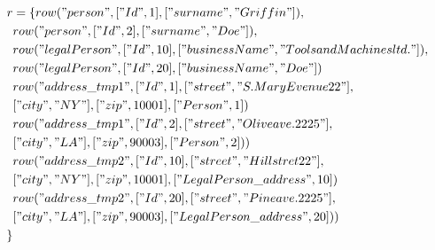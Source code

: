 \documentclass[11pt]{article}
\begin{document}
\begin{align*}
r &= \{ row("person", ["Id", 1], ["surname", "Griffin"]), \\
& row("person", ["Id", 2], ["surname", "Doe"]), \\
& row("legalPerson", ["Id", 10], ["businessName", "Tools and Machines ltd."]), \\
& row("legalPerson", ["Id", 20], ["businessName", "Doe"])\\
& row("address\_tmp1", ["Id", 1], ["street", "S. Mary Evenue 22"], \\ 
& ["city", "NY"], ["zip", 10001], ["Person", 1]) \\
& row("address\_tmp1", ["Id", 2], ["street", "Olive ave. 2225"], \\
& ["city", "LA"], ["zip", 90003], ["Person", 2]) )\\
& row("address\_tmp2", ["Id", 10], ["street", "Hill stret 22"], \\
& ["city", "NY"], ["zip", 10001], ["LegalPerson\_address", 10]) \\
& row("address\_tmp2", ["Id", 20], ["street", "Pine ave. 2225"], \\
& ["city", "LA"], ["zip", 90003], ["LegalPerson\_address", 20]) )\\
\}
\end{align*}
\end{document}
